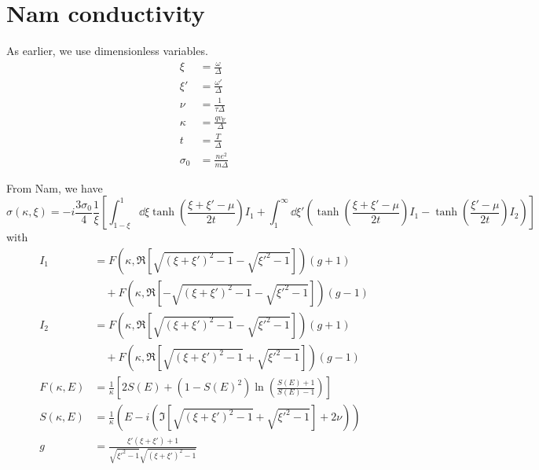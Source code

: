 \documentclass{article}
\newcommand{\vf}{v_{\mathrm{F}}}
\begin{document}
\section{Nam conductivity}
As earlier, we use dimensionless variables.
\begin{align}
	\xi &= \frac{\omega}{\Delta} \\
	\xi' &= \frac{\omega'}{\Delta} \\
	\nu &= \frac{1}{\tau \Delta} \\
	\kappa &= \frac{q \vf}{\Delta} \\
	t &= \frac{T}{\Delta} \\
	\sigma_0 &= \frac{n e^2}{m \Delta}
\end{align}

From Nam, we have
\begin{equation}
	\sigma(\kappa, \xi) = -i \frac{3 \sigma_0}{4} \frac{1}{\xi}\left[\int_{1 - \xi}^{1}\dd{\xi} \tanh(\frac{\xi + \xi' - \mu}{2 t}) I_1 + \int_{1}^{\infty} \dd{\xi'} \left( \tanh(\frac{\xi + \xi' - \mu}{2t}) I_1  - \tanh(\frac{\xi' - \mu}{2t})I_2 \right) \right]
\end{equation}
with
\begin{align}
	I_1 &= F(\kappa, \Re[\sqrt{(\xi + \xi')^2 - 1} - \sqrt{\xi'^2 - 1}]) (g + 1) \nonumber\\
	&\quad + F(\kappa, \Re[-\sqrt{(\xi + \xi')^2 - 1} - \sqrt{\xi'^2 - 1}]) (g - 1) \\
	I_2 &= F(\kappa, \Re[\sqrt{(\xi + \xi')^2 - 1} - \sqrt{\xi'^2 - 1}]) (g + 1) \nonumber\\
	&\quad + F(\kappa, \Re[\sqrt{(\xi + \xi')^2 - 1} + \sqrt{\xi'^2 - 1}]) (g - 1) \\
	F(\kappa, E) &= \frac{1}{\kappa} \left[2 S(E) + (1 - S(E)^2)\ln(\frac{S(E) + 1}{S(E) - 1})\right]  \\
	S(\kappa, E) &= \frac{1}{\kappa} \left(E - i \left(\Im[\sqrt{(\xi + \xi')^2 - 1} + \sqrt{\xi'^2 - 1}] + 2 \nu \right) \right) \\
	g  &= \frac{\xi' \left( \xi + \xi'\right) + 1}{\sqrt{\xi'^2 - 1}\sqrt{(\xi + \xi')^2 - 1}}
\end{align}


\printbibliography
\end{document}
